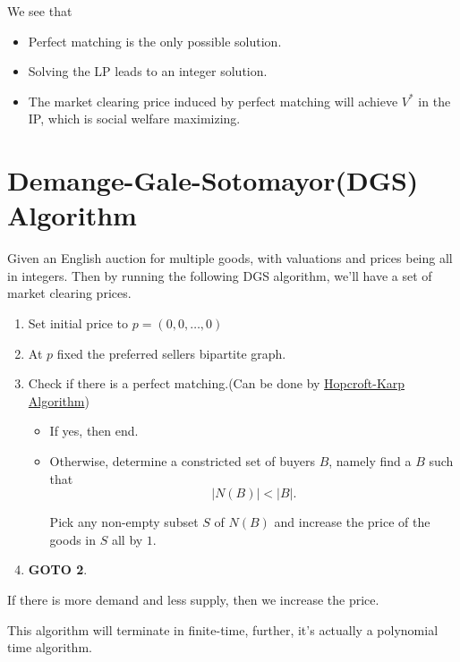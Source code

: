 \begin{remark}
	We see that
	\begin{itemize}
		\item Perfect matching is the only possible solution.
		\item Solving the LP leads to an integer solution.
		\item The market clearing price induced by perfect matching will achieve \(V^{\ast}\) in the IP, which is social welfare maximizing.
	\end{itemize}
\end{remark}

\section{Demange-Gale-Sotomayor(DGS) Algorithm}
Given an English auction for multiple goods, with valuations and prices being all in integers. Then by running the following DGS algorithm, we'll have
a set of market clearing prices.
\begin{enumerate}
	\item Set initial price to \(p = (0, 0, \ldots , 0 )\)
	\item At \(p\) fixed the preferred sellers bipartite graph.
	\item Check if there is a perfect matching.(Can be done by \hyperref[Hopcroft-Karp Algorithm]{Hopcroft-Karp Algorithm})
	      \begin{itemize}
		      \item If yes, then end.
		      \item Otherwise, determine a constricted set of buyers \(B\), namely find a \(B\) such that
		            \[
			            \left\vert N(B) \right\vert < \left\vert B \right\vert.
		            \]

		            Pick any non-empty subset \(S\) of \(N(B)\) and increase the price of the goods in \(S\) all by \(1\).
	      \end{itemize}
	\item \textbf{GOTO 2}.
\end{enumerate}

\begin{intuition}
	If there is more demand and less supply, then we increase the price.
\end{intuition}

\begin{remark}
	This algorithm will terminate in finite-time, further, it's actually a polynomial time algorithm.
\end{remark}

